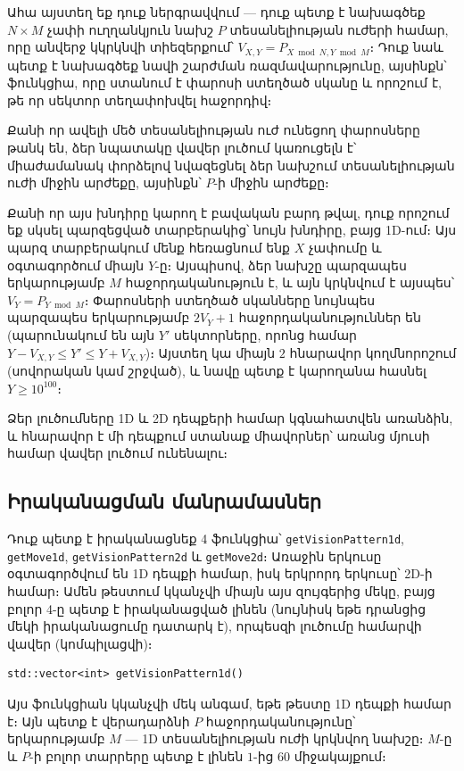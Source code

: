 \documentclass[12pt]{article}
\begin{document}
Ահա այստեղ եք դուք ներգրավվում — դուք պետք է նախագծեք $N \times M$ չափի ուղղանկյուն նախշ $P$ տեսանելիության ուժերի համար, որը անվերջ կկրկնվի տիեզերքում՝ $V_{X, Y} = P_{X \bmod N, Y \bmod M}$։ Դուք նաև պետք է նախագծեք նավի շարժման ռազմավարությունը, այսինքն՝ ֆունկցիա, որը ստանում է փարոսի ստեղծած սկանը և որոշում է, թե որ սեկտոր տեղափոխվել հաջորդիվ։

Քանի որ ավելի մեծ տեսանելիության ուժ ունեցող փարոսները թանկ են, ձեր նպատակը վավեր լուծում կառուցելն է՝ միաժամանակ փորձելով նվազեցնել ձեր նախշում տեսանելիության ուժի միջին արժեքը, այսինքն՝ $P$-ի միջին արժեքը։

Քանի որ այս խնդիրը կարող է բավական բարդ թվալ, դուք որոշում եք սկսել պարզեցված տարբերակից՝ նույն խնդիրը, բայց 1D-ում։ Այս պարզ տարբերակում մենք հեռացնում ենք $X$ չափումը և օգտագործում միայն $Y$-ը։ Այսպիսով, ձեր նախշը պարզապես երկարությամբ $M$ հաջորդականություն է, և այն կրկնվում է այսպես՝ $V_Y = P_{Y \bmod M}$։ Փարոսների ստեղծած սկանները նույնպես պարզապես երկարությամբ $2V_Y + 1$ հաջորդականություններ են (պարունակում են այն $Y'$ սեկտորները, որոնց համար $Y - V_{X, Y} \leq Y' \leq Y + V_{X, Y}$)։ Այստեղ կա միայն $2$ հնարավոր կողմնորոշում (սովորական կամ շրջված), և նավը պետք է կարողանա հասնել $Y \geq 10^{100}$։

Ձեր լուծումները 1D և 2D դեպքերի համար կգնահատվեն առանձին, և հնարավոր է մի դեպքում ստանաք միավորներ՝ առանց մյուսի համար վավեր լուծում ունենալու։

\subsection{Իրականացման մանրամասներ}

Դուք պետք է իրականացնեք 4 ֆունկցիա՝ \verb|getVisionPattern1d|, \verb|getMove1d|, \verb|getVisionPattern2d| և \verb|getMove2d|։ Առաջին երկուսը օգտագործվում են 1D դեպքի համար, իսկ երկրորդ երկուսը՝ 2D-ի համար։ Ամեն թեստում կկանչվի միայն այս զույգերից մեկը, բայց բոլոր 4-ը պետք է իրականացված լինեն (նույնիսկ եթե դրանցից մեկի իրականացումը դատարկ է), որպեսզի լուծումը համարվի վավեր (կոմպիլացվի)։

\begin{lstlisting}
std::vector<int> getVisionPattern1d()
\end{lstlisting}

Այս ֆունկցիան կկանչվի մեկ անգամ, եթե թեստը 1D դեպքի համար է։ Այն պետք է վերադարձնի $P$ հաջորդականությունը՝ երկարությամբ $M$ — 1D տեսանելիության ուժի կրկնվող նախշը։ $M$-ը և $P$-ի բոլոր տարրերը պետք է լինեն $1$-ից $60$ միջակայքում։
\end{document}
